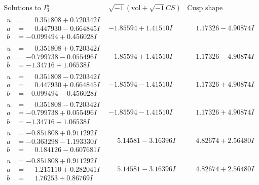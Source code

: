 \documentclass[1p]{elsarticle_modified}
\theoremstyle{definition}
\newcommand{\I}{\sqrt{-1}}
\begin{document}
$$\begin{array}{c|c|c}  
\text{Solutions to }I^u_{3}& \I (\text{vol} + \sqrt{-1}CS) & \text{Cusp shape}\\
 \hline 
\begin{aligned}
u &= \phantom{-}0.351808 + 0.720342 I \\
a &= \phantom{-}0.447930 - 0.664845 I \\
b &= -0.099494 + 0.456028 I\end{aligned}
 & -1.85594 + 1.41510 I & \phantom{-}1.17326 - 4.90874 I \\ \hline\begin{aligned}
u &= \phantom{-}0.351808 + 0.720342 I \\
a &= -0.799738 - 0.055496 I \\
b &= -1.34716 + 1.06538 I\end{aligned}
 & -1.85594 + 1.41510 I & \phantom{-}1.17326 - 4.90874 I \\ \hline\begin{aligned}
u &= \phantom{-}0.351808 - 0.720342 I \\
a &= \phantom{-}0.447930 + 0.664845 I \\
b &= -0.099494 - 0.456028 I\end{aligned}
 & -1.85594 - 1.41510 I & \phantom{-}1.17326 + 4.90874 I \\ \hline\begin{aligned}
u &= \phantom{-}0.351808 - 0.720342 I \\
a &= -0.799738 + 0.055496 I \\
b &= -1.34716 - 1.06538 I\end{aligned}
 & -1.85594 - 1.41510 I & \phantom{-}1.17326 + 4.90874 I \\ \hline\begin{aligned}
u &= -0.851808 + 0.911292 I \\
a &= -0.363298 - 1.193330 I \\
b &= \phantom{-}0.184126 - 0.607681 I\end{aligned}
 & \phantom{-}5.14581 - 3.16396 I & \phantom{-}4.82674 + 2.56480 I \\ \hline\begin{aligned}
u &= -0.851808 + 0.911292 I \\
a &= \phantom{-}1.215110 + 0.282041 I \\
b &= \phantom{-}1.76253 + 0.86769 I\end{aligned}
 & \phantom{-}5.14581 - 3.16396 I & \phantom{-}4.82674 + 2.56480 I \\ \hline\begin{aligned}

\end{aligned}
\end{array}$$
\end{document}
